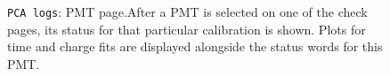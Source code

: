 \documentclass[12pt]{article}
\begin{document}
\begin{figure}
\centering
\noindent{}
  \caption{\centering \texttt{PCA logs}: PMT page.\hspace{\textwidth}After a PMT is selected on one of the check pages, its status for that particular calibration is shown. Plots for time and charge fits are displayed alongside the status words for this PMT.}
  \label{fig:log3}
\end{figure}
\end{document}
